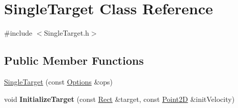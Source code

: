 \hypertarget{classSingleTarget}{}\section{Single\+Target Class Reference}
\label{classSingleTarget}


{\ttfamily \#include $<$Single\+Target.\+h$>$}

\subsection*{Public Member Functions}
\begin{DoxyCompactItemize}
\item 
\hyperlink{classSingleTarget_a0f9683df9354a8256f622db973130833}{Single\+Target} (const \hyperlink{structOptions}{Options} \&ops)
\item 
\hypertarget{classSingleTarget_afa791ad34c84b8a9d9d2e60398e5db2e}{}void {\bfseries Initialize\+Target} (const \hyperlink{classRect}{Rect} \&target, const \hyperlink{classPoint2D}{Point2\+D} \&init\+Velocity)\label{classSingleTarget_afa791ad34c84b8a9d9d2e60398e5db2e}


\end{DoxyCompactItemize}
